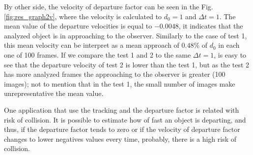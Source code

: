 By other side, the velocity of departure factor can be seen in the 
Fig. \ref{fig:res_graph2v}, where the velocity is calculated
to $d_0=1$ and $\Delta t=1$. The mean value of the departure
velocities is equal to $-0.0048$, it indicates that the
analyzed object is in approaching to the observer. Similarly
to the case of test 1, this mean velocity can be interpret
as a mean approach of $0.48\%$ of $d_0$ in each one of 100 frames.
If we compare the test 1 and 2 to the same $\Delta t=1$, is easy to see
that the departure velocity of test 2  is lower than the test 1, 
but as the test 2 has more analyzed frames the approaching to the observer
is greater (100 images); 
not to mention that in the test 1, the small number of images 
make  unrepresentative the mean value.

One application that use the tracking and the departure factor 
is related with risk of collision.
It is possible to estimate how of fast an object is departing,
and thus, if the  departure factor tends to zero or 
if the velocity of departure factor changes to lower negatives values every time, 
probably, there is a high risk of collision.


